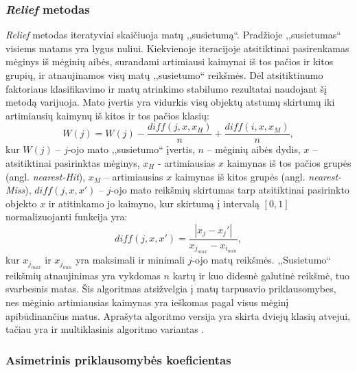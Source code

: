 \subsubsection{\textit{Relief} metodas}

\textit{Relief} metodas iteratyviai skaičiuoja matų ,,susietumą``. Pradžioje ,,susietumas`` visiems matams yra lygus nuliui. Kiekvienoje
iteracijoje atsitiktinai pasirenkamas mėginys iš mėginių aibės, surandami artimiausi kaimynai iš tos pačios ir kitos grupių, ir atnaujinamos visų 
matų ,,susietumo`` reikšmės. Dėl atsitiktinumo faktoriaus klasifikavimo ir  matų atrinkimo stabilumo rezultatai naudojant šį metodą varijuoja. Mato įvertis yra vidurkis visų objektų atstumų skirtumų iki artimiausių kaimynų iš kitos ir tos pačios klasių:
\begin{equation}
 W(j)=W(j) - \frac{diff(j, x, x_H)}{n} + \frac{diff(i, x, x_M)}{n},
\end{equation}
kur 
$W(j)$ -- $j$-ojo mato ,,susietumo`` įvertis, 
$n$ -- mėginių aibės dydis, 
$x$ -- atsitiktinai pasirinktas mėginys, 
$x_H$ - artimiausias $x$ kaimynas iš tos pačios grupės (angl. \textit{nearest-Hit}), 
$x_M$ -- artimiausias $x$ kaimynas iš kitos grupės (angl. \textit{nearest-Miss}),
$diff(j, x, x')$ -- $j$-ojo mato reikšmių skirtumas tarp atsitiktinai pasirinkto objekto $x$ ir atitinkamo jo kaimyno, kur skirtumą į intervalą $[0, 1]$ normalizuojanti funkcija yra:
\begin{equation}
 diff(j, x, x')=\frac{|x_j- x_j'|}{x_{j_{max}} - x_{i_{min}}},
\end{equation}
kur $x_{j_{max}}$ ir $x_{j_{min}}$ yra maksimali ir minimali $j$-ojo matų reikšmės. ,,Susietumo`` reikšmių atnaujinimas yra vykdomas $n$ kartų ir kuo didesnė galutinė reikšmė, tuo svarbesnis matas. Šis algoritmas atsižvelgia į matų tarpusavio priklausomybes, nes mėginio artimiausias kaimynas yra ieškomas pagal visus mėginį apibūdinančius matus. Aprašyta algoritmo versija yra skirta dviejų klasių atvejui, tačiau yra ir multiklasinis algoritmo variantas \cite{DBLP:journals/ml/Robnik-SikonjaK03}.

\subsubsection{Asimetrinis priklausomybės koeficientas}

